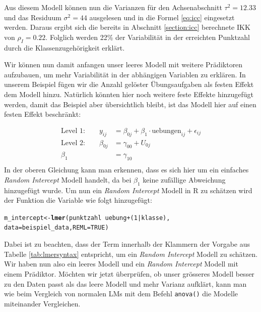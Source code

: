 \documentclass[12pt]{article}\usepackage[]{graphicx}\usepackage[]{color}
\makeatletter
\newcommand{\hlnum}[1]{\textcolor[rgb]{0.686,0.059,0.569}{#1}}%
\newcommand{\hlopt}[1]{\textcolor[rgb]{0,0,0}{#1}}%
\newcommand{\hlstd}[1]{\textcolor[rgb]{0.345,0.345,0.345}{#1}}%
\newcommand{\hlkwb}[1]{\textcolor[rgb]{0.69,0.353,0.396}{#1}}%
\newcommand{\hlkwc}[1]{\textcolor[rgb]{0.333,0.667,0.333}{#1}}%
\newcommand{\hlkwd}[1]{\textcolor[rgb]{0.737,0.353,0.396}{\textbf{#1}}}%
\newenvironment{kframe}{%
 \def\at@end@of@kframe{}%
 \ifinner\ifhmode%
  \def\at@end@of@kframe{\end{minipage}}%
  \begin{minipage}{\columnwidth}%
 \fi\fi%
 \def\FrameCommand##1{\hskip\@totalleftmargin \hskip-\fboxsep
 \colorbox{shadecolor}{##1}\hskip-\fboxsep
     \hskip-\linewidth \hskip-\@totalleftmargin \hskip\columnwidth}%
 \MakeFramed {\advance\hsize-\width
   \@totalleftmargin\z@ \linewidth\hsize
   \@setminipage}}%
 {\par\unskip\endMakeFramed%
 \at@end@of@kframe}
\newenvironment{knitrout}{}{} %
\makeatother
\begin{document}
Aus diesem Modell können nun die Varianzen für den Achsenabschnitt $\tau^2 = 12.33$ und das Residuum $\sigma^2 = 44$ ausgelesen und in die Formel \eqref{eq:icc} eingesetzt werden. Daraus ergibt sich die bereits in Abschnitt \ref{section:icc} berechnete IKK von $\rho_I = 0.22$. Folglich werden 22\% der Variabilität in der erreichten Punktzahl durch die Klassenzugehörigkeit erklärt.

Wir können nun damit anfangen unser leeres Modell mit weitere Prädiktoren aufzubauen, um mehr Variabilität in der abhängigen Variablen zu erklären. In unserem Beispiel fügen wir die Anzahl gelöster Übungsaufgaben als festen Effekt dem Modell hinzu. Natürlich könnten hier noch weitere feste Effekte hinzugefügt werden, damit das Beispiel aber übersichtlich bleibt, ist das Modell hier auf einen festen Effekt beschränkt:

\begin{equation}
\begin{split}	
 \text{Level 1:}  \qquad y_{ij} & = \beta_{0j} + \beta_{1} \cdot \text{uebungen}_{ij} + \epsilon_{ij}\\
 \text{Level 2:} \qquad \beta_{0j} & = \gamma_{00} + U_{0j}\\
 \beta_{1} & = \gamma_{10}\\
\end{split}	
\end{equation} 
In der oberen Gleichung kann man erkennen, dass es sich hier um ein einfaches \textit{Random Intercept} Modell handelt, da bei $\beta_{1}$ keine zufällige Abweichung hinzugefügt wurde. Um nun ein \textit{Random Intercept} Modell in R zu schätzen wird der Funktion die Variable wie folgt hinzugefügt:

\singlespacing
\begin{knitrout}
\color{fgcolor}\begin{kframe}
\begin{alltt}
\hlstd{m_intercept} \hlkwb{<-} \hlkwd{lmer}\hlstd{(punktzahl} \hlopt{~} \hlstd{uebung} \hlopt{+} \hlstd{(}\hlnum{1} \hlopt{|} \hlstd{klasse),}
        \hlkwc{data} \hlstd{= beispiel_data,} \hlkwc{REML} \hlstd{=} \hlnum{TRUE}\hlstd{)}
\end{alltt}
\end{kframe}
\end{knitrout}

Dabei ist zu beachten, dass der Term innerhalb der Klammern der Vorgabe aus Tabelle \ref{tab:lmersyntax} entspricht, um ein \textit{Random Intercept} Modell zu schätzen. Wir haben nun also ein leeres Modell und ein \textit{Random Intercept} Modell mit einem Prädiktor. Möchten wir jetzt überprüfen, ob unser grösseres Modell besser zu den Daten passt als das leere Modell und mehr Varianz aufklärt, kann man wie beim Vergleich von normalen LMs mit dem Befehl \texttt{anova()} die Modelle miteinander Vergleichen. 
\end{document}
